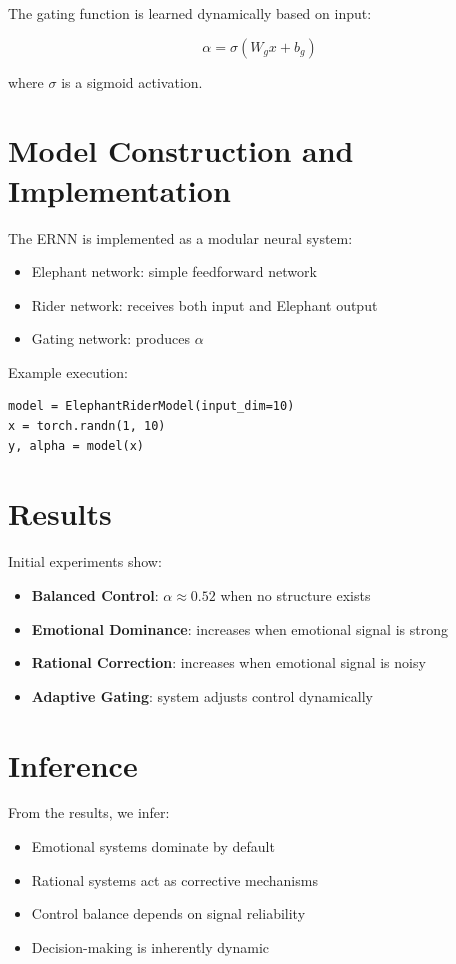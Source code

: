 \documentclass[12pt]{article}
\begin{document}
The gating function is learned dynamically based on input:

\[
\alpha = \sigma(W_g x + b_g)
\]

where $\sigma$ is a sigmoid activation.

\section{Model Construction and Implementation}

The ERNN is implemented as a modular neural system:

\begin{itemize}
\item Elephant network: simple feedforward network
\item Rider network: receives both input and Elephant output
\item Gating network: produces $\alpha$
\end{itemize}

Example execution:

\begin{verbatim}
model = ElephantRiderModel(input_dim=10)
x = torch.randn(1, 10)
y, alpha = model(x)
\end{verbatim}

\section{Results}

Initial experiments show:

\begin{itemize}
\item \textbf{Balanced Control}: $\alpha \approx 0.52$ when no structure exists
\item \textbf{Emotional Dominance}: increases when emotional signal is strong
\item \textbf{Rational Correction}: increases when emotional signal is noisy
\item \textbf{Adaptive Gating}: system adjusts control dynamically
\end{itemize}

\section{Inference}

From the results, we infer:

\begin{itemize}
\item Emotional systems dominate by default
\item Rational systems act as corrective mechanisms
\item Control balance depends on signal reliability
\item Decision-making is inherently dynamic
\end{itemize}
\end{document}
